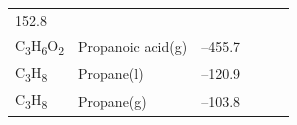 \documentclass[
  9pt,
]{extbook}
\theoremstyle{definition}
\theoremstyle{definition}
\theoremstyle{definition}
\theoremstyle{remark}
\begin{document}
\begin{longtable}[]{@{}llllll@{}}
\begin{minipage}[t]{0.14\columnwidth}
152.8\strut
\end{minipage}\tabularnewline
\begin{minipage}[t]{0.07\columnwidth}\raggedright
C\textsubscript{3}H\textsubscript{6}O\textsubscript{2}\strut
\end{minipage} & \begin{minipage}[t]{0.17\columnwidth}\raggedright
Propanoic acid(g)\strut
\end{minipage} & \begin{minipage}[t]{0.15\columnwidth}\raggedright
--455.7\strut
\end{minipage} & \begin{minipage}[t]{0.15\columnwidth}\raggedright
\strut
\end{minipage} & \begin{minipage}[t]{0.14\columnwidth}\raggedright
\strut
\end{minipage} & \begin{minipage}[t]{0.14\columnwidth}\raggedright
\strut
\end{minipage}\tabularnewline
\begin{minipage}[t]{0.07\columnwidth}\raggedright
C\textsubscript{3}H\textsubscript{8}\strut
\end{minipage} & \begin{minipage}[t]{0.17\columnwidth}\raggedright
Propane(l)\strut
\end{minipage} & \begin{minipage}[t]{0.15\columnwidth}\raggedright
--120.9\strut
\end{minipage} & \begin{minipage}[t]{0.15\columnwidth}\raggedright
\strut
\end{minipage} & \begin{minipage}[t]{0.14\columnwidth}\raggedright
\strut
\end{minipage} & \begin{minipage}[t]{0.14\columnwidth}\raggedright
\strut
\end{minipage}\tabularnewline
\begin{minipage}[t]{0.07\columnwidth}\raggedright
C\textsubscript{3}H\textsubscript{8}\strut
\end{minipage} & \begin{minipage}[t]{0.17\columnwidth}\raggedright
Propane(g)\strut
\end{minipage} & \begin{minipage}[t]{0.15\columnwidth}\raggedright
--103.8\strut
\end{minipage} & \begin{minipage}[t]{0.15\columnwidth}\raggedright

\end{minipage}
\end{longtable}
\end{document}
